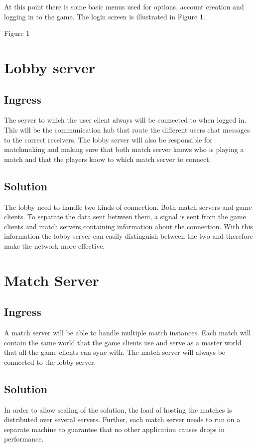 \documentclass[11pt]{report}
\begin{document}
At this point there is some basic menus used for options, account creation and logging in to the game. The login screen is illustrated in Figure 1.

Figure 1

\section{Lobby server}
\subsection{Ingress}

The server to which the user client always will be connected to when logged in. This will be the communication hub that route the different users chat messages to the correct receivers. The lobby server will also be responsible for matchmaking and making sure that both match server knows who is playing a match and that the players know to which match server to connect. 
\subsection{Solution}

The lobby need to handle two kinds of connection. Both match servers and game clients. To separate the data sent between them, a signal is sent from the game clients and match servers containing information about the connection. With this information the lobby server can easily distinguish between the two and therefore make the network more effective. 
\section{Match Server}
\subsection{Ingress}

A match server will be able to handle multiple match instances. Each match will contain the same world that the game clients use and serve as a master world that all the game clients can sync with. The match server will always be connected to the lobby server.
\subsection{Solution}

In order to allow scaling of the solution, the load of hosting the matches is distributed over several servers. Further, each match server needs to run on a separate machine to guarantee that no other application causes drops in performance. 
\end{document}
